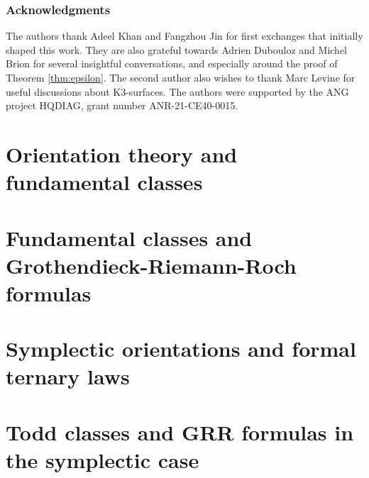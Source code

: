 \documentclass[11pt,leqno]{amsart}
\newcommand{\fred}[1]{\textcolor{blue}{#1}} %
\theoremstyle{remark}
\theoremstyle{definition}
\numberwithin{equation}{thm}
\begin{document}

\subsubsection*{Acknowledgments}

The authors thank Adeel Khan and Fangzhou Jin for first exchanges
 that initially shaped this work.
They are also grateful towards Adrien Dubouloz and Michel Brion for several insightful conversations,
 and especially around the proof of Theorem \ref{thm:epsilon}. The second author also wishes to thank Marc Levine for useful discussions about K3-surfaces.
 The authors were supported by the ANG project HQDIAG, grant number ANR-21-CE40-0015.

\section{Orientation theory and fundamental classes}



\section{Fundamental classes and Grothendieck-Riemann-Roch formulas}



\section{Symplectic orientations and formal ternary laws}



\section{Todd classes and GRR formulas in the symplectic case}\label{sec:grr}





\end{document}
